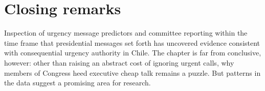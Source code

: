 \documentclass[letter,12pt]{article}
\begin{document}



\section{Closing remarks}

Inspection of urgency message predictors and committee reporting within the time frame that presidential messages set forth has uncovered evidence consistent with consequential urgency authority in Chile. The chapter is far from conclusive, however: other than raising an abstract cost of ignoring urgent calls, why members of Congress heed executive cheap talk remains a puzzle. But patterns in the data suggest a promising area for research.  
\end{document}
